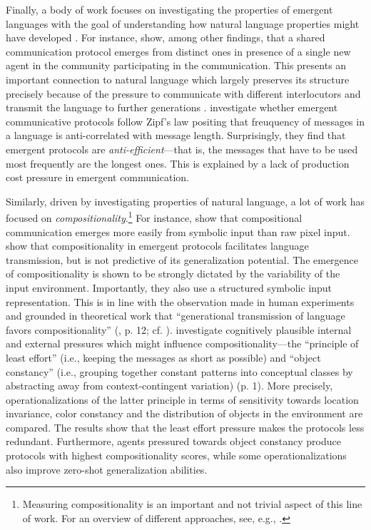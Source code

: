 Finally, a body of work focuses on investigating the properties of emergent languages with the goal of understanding how natural language properties might have developed \parencite{lazaridou2020emergent}. For instance, \cite{graesser2019emergent} show, among other findings, that a shared communication protocol emerges from distinct ones in presence of a single new agent in the community participating in the communication. This presents an important connection to natural language which largely preserves its structure precisely because of the pressure to communicate with different interlocutors and transmit the language to further generations \parencite{tomasello2010origins}. \cite{chaabouni2019anti} investigate whether emergent communicative protocols follow Zipf's law positing that freuquency of messages in a language is anti-correlated with message length. Surprisingly, they find that emergent protocols are \textit{anti-efficient}---that is, the messages that have to be used most frequently are the longest ones. This is explained by a lack of production cost pressure in emergent communication.

Similarly, driven by investigating properties of natural language, a lot of work has focused on \textit{compositionality}.\footnote{Measuring compositionality is an important and not trivial aspect of this line of work. For an overview of different approaches, see, e.g., \cite{lazaridou2020emergent}.} For instance, \cite{lazaridou2018emergence} show that compositional communication emerges more easily from symbolic input than raw pixel input. 
\cite{chaabouni2020compositionality} show that compositionality in emergent protocols facilitates language transmission, but is not predictive of its generalization potential. The emergence of compositionality is shown to be strongly dictated by the variability of the input environment. Importantly, they also use a structured symbolic input representation.
This is in line with the observation made in human experiments and grounded in theoretical work that ``generational transmission of language favors compositionality'' (\cite{lazaridou2020emergent}, p. 12; cf. \cite{kirby2014iterated}).
\cite{luna2020internal} investigate cognitively plausible internal and external pressures which might influence compositionality---the ``principle of least effort'' (i.e., keeping the messages as short as possible) and ``object constancy'' (i.e., grouping together constant patterns into conceptual classes by abstracting away from context-contingent variation) (p. 1). More precisely, operationalizations of the latter principle in terms of sensitivity towards location invariance, color constancy and the distribution of objects in the environment are compared. The results show that the least effort pressure makes the protocols less redundant. Furthermore, agents pressured towards object constancy produce protocols with highest compositionality scores, while some operationalizations also improve zero-shot generalization abilities. 

